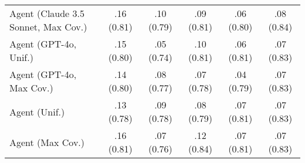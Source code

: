 \begin{table}[h!]
\begin{tabular}{lccccc}
    Agent (Claude 3.5 Sonnet, Max Cov.) & .16 {\small (0.81)} & .10 {\small (0.79)} & .09 {\small (0.81)} & .06 {\small (0.80)} & \cellcolor{silver!30}.08 {\small (0.84)} \\
    Agent (GPT-4o, Unif.) & .15 {\small (0.80)} & .05 {\small (0.74)} & .10 {\small (0.81)} & .06 {\small (0.81)} & .07 {\small (0.83)} \\
    Agent (GPT-4o, Max Cov.) & .14 {\small (0.80)} & .08 {\small (0.77)} & .07 {\small (0.78)} & .04 {\small (0.79)} & .07 {\small (0.83)} \\
    Agent (Unif.) & .13 {\small (0.78)} & .09 {\small (0.78)} & .08 {\small (0.79)} & .07 {\small (0.81)} & .07 {\small (0.83)} \\
    Agent (Max Cov.) & .16 {\small (0.81)} & .07 {\small (0.76)} & \cellcolor{silver!30}.12 {\small (0.84)} & .07 {\small (0.81)} & .07 {\small (0.83)} \\
    \bottomrule
    \end{tabular}
\end{table}